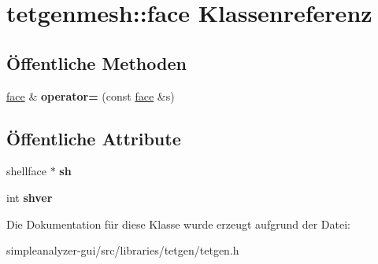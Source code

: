 \hypertarget{classtetgenmesh_1_1face}{\section{tetgenmesh\-:\-:face Klassenreferenz}
\label{classtetgenmesh_1_1face}
}
\subsection*{Öffentliche Methoden}
\begin{DoxyCompactItemize}
\item 
\hypertarget{classtetgenmesh_1_1face_a1321d78f189cee6bc26d71a985ee8dbe}{\hyperlink{classtetgenmesh_1_1face}{face} \& {\bfseries operator=} (const \hyperlink{classtetgenmesh_1_1face}{face} \&s)}\label{classtetgenmesh_1_1face_a1321d78f189cee6bc26d71a985ee8dbe}

\end{DoxyCompactItemize}
\subsection*{Öffentliche Attribute}
\begin{DoxyCompactItemize}
\item 
\hypertarget{classtetgenmesh_1_1face_a0ebac53728a624fcb6528a7d2571b987}{shellface $\ast$ {\bfseries sh}}\label{classtetgenmesh_1_1face_a0ebac53728a624fcb6528a7d2571b987}

\item 
\hypertarget{classtetgenmesh_1_1face_a990a58ccf240d0d4197c2a923a1853d6}{int {\bfseries shver}}\label{classtetgenmesh_1_1face_a990a58ccf240d0d4197c2a923a1853d6}

\end{DoxyCompactItemize}


Die Dokumentation für diese Klasse wurde erzeugt aufgrund der Datei\-:\begin{DoxyCompactItemize}
\item 
simpleanalyzer-\/gui/src/libraries/tetgen/tetgen.\-h\end{DoxyCompactItemize}
